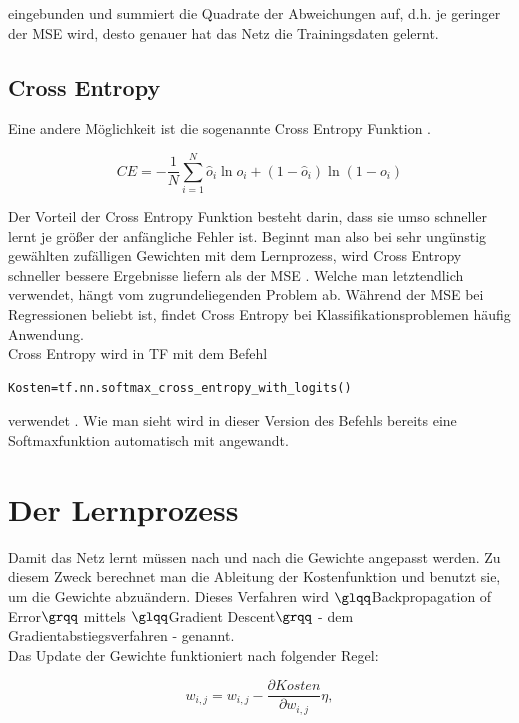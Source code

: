 eingebunden und summiert die Quadrate der Abweichungen auf, d.h. je geringer der \gls{MSE} wird, desto genauer hat das Netz die Trainingsdaten gelernt.


\subsection{Cross Entropy}
Eine andere M\"oglichkeit ist die sogenannte Cross Entropy Funktion \cite{Nielsen}.

\begin{equation}
CE= - \frac{1}{N} \sum_{i=1}^{N}\hat{o}_i \ln o_i + (1- \hat{o}_i) \ln (1-o_i)
\end{equation}

Der Vorteil der Cross Entropy Funktion besteht darin, dass sie umso schneller lernt je gr\"o\ss er der anf\"angliche Fehler ist. Beginnt man also bei sehr ung\"unstig gew\"ahlten zuf\"alligen Gewichten mit dem Lernprozess, wird Cross Entropy schneller bessere Ergebnisse liefern als der \gls{MSE} \cite{Nielsen}. Welche man letztendlich verwendet, h\"angt vom zugrundeliegenden Problem ab. Während der \gls{MSE} bei Regressionen beliebt ist, findet Cross Entropy bei Klassifikationsproblemen häufig Anwendung.\\
Cross Entropy wird in \gls{TF} mit dem Befehl

\vspace{0.3cm} 
\begin{lstlisting}
Kosten=tf.nn.softmax_cross_entropy_with_logits()
\end{lstlisting}

verwendet \cite{cookbook}. Wie man sieht wird in dieser Version des Befehls bereits eine Softmaxfunktion automatisch mit angewandt.



\section{Der Lernprozess}
Damit das Netz lernt m\"ussen nach und nach die Gewichte angepasst werden. Zu diesem Zweck berechnet man die Ableitung der Kostenfunktion und benutzt sie, um die Gewichte abzu\"andern. Dieses Verfahren wird $\glqq$Backpropagation of Error$\grqq$ mittels $\glqq$Gradient Descent$\grqq$ - dem Gradientabstiegsverfahren - genannt.\\
Das Update der Gewichte funktioniert nach folgender Regel: \cite{Rojas1996}

\begin{equation}
w_{i,j}=w_{i,j}-\frac{\partial Kosten }{\partial w_{i,j}}\eta,
\end{equation}

